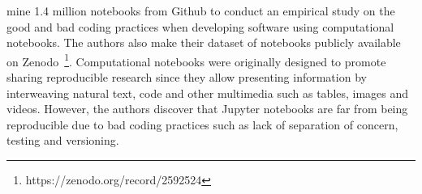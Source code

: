 \documentclass[acmsmall,screen,review,anonymous]{acmart}
\begin{document}
\citeauthor{pimentel2019large} mine 1.4 million notebooks from Github to conduct an empirical study on the good and bad coding practices when developing software using computational notebooks. The authors also make their dataset of notebooks publicly available on Zenodo~\footnote{https://zenodo.org/record/2592524}. Computational notebooks were originally designed to promote sharing reproducible research since they allow presenting information by interweaving natural text, code and other multimedia such as tables, images and videos. However, the authors discover that Jupyter notebooks are far from being reproducible due to bad coding practices such as lack of separation of concern, testing and versioning.






\end{document}
